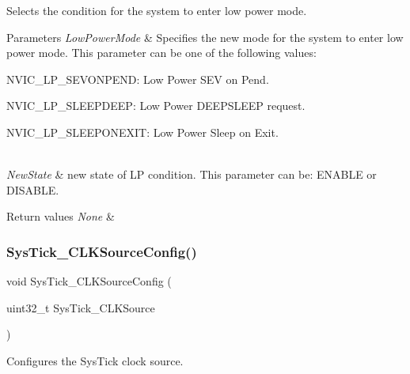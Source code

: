 Selects the condition for the system to enter low power mode. 


\begin{DoxyParams}{Parameters}
{\em Low\+Power\+Mode} & Specifies the new mode for the system to enter low power mode. This parameter can be one of the following values\+: \begin{DoxyItemize}
\item N\+V\+I\+C\+\_\+\+L\+P\+\_\+\+S\+E\+V\+O\+N\+P\+E\+ND\+: Low Power S\+EV on Pend. \item N\+V\+I\+C\+\_\+\+L\+P\+\_\+\+S\+L\+E\+E\+P\+D\+E\+EP\+: Low Power D\+E\+E\+P\+S\+L\+E\+EP request. \item N\+V\+I\+C\+\_\+\+L\+P\+\_\+\+S\+L\+E\+E\+P\+O\+N\+E\+X\+IT\+: Low Power Sleep on Exit. \end{DoxyItemize}
\\
\hline
{\em New\+State} & new state of LP condition. This parameter can be\+: E\+N\+A\+B\+LE or D\+I\+S\+A\+B\+LE. \\
\hline
\end{DoxyParams}

\begin{DoxyRetVals}{Return values}
{\em None} & \\
\hline
\end{DoxyRetVals}
\mbox{\label{group___m_i_s_c___private___functions_ga2777d255bb06ad62bb6372a9db1ff385}} 
\subsubsection{\texorpdfstring{Sys\+Tick\+\_\+\+C\+L\+K\+Source\+Config()}{SysTick\_CLKSourceConfig()}}
{\footnotesize\ttfamily void Sys\+Tick\+\_\+\+C\+L\+K\+Source\+Config (\begin{DoxyParamCaption}\item[{uint32\+\_\+t}]{Sys\+Tick\+\_\+\+C\+L\+K\+Source }\end{DoxyParamCaption})}



Configures the Sys\+Tick clock source. 



